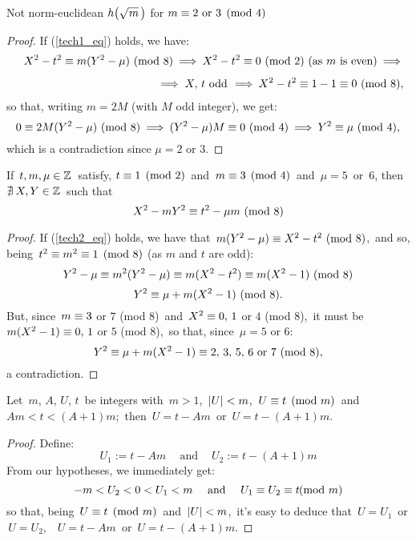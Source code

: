 \begin{subsection}{Not norm-euclidean $\hh{m}$ for %
                   $m \equiv 2 \text{ or } 3 \pmod 4$}
\begin{proof}
%
If (\ref{tech1_eq}) holds, we have:
\begin{eqnarray*}
& & X^2 - t^2 \equiv m(Y^2 - \mu)\ \mathrm{(mod\ 8)}
\:\Longrightarrow\: X^2 - t^2 \equiv 0\ \mathrm{(mod\ 2)}
\ \text{(as $m$ is even)} \:\Longrightarrow\:
\\[4pt]
& & \Longrightarrow\; X,\,t\ \textrm{odd}\, \:\Longrightarrow\:
X^2 - t^2 \equiv 1 - 1 \equiv 0\ \mathrm{(mod\ 8)},
\end{eqnarray*}
so that, writing $m = 2M$ (with $M$ odd integer), we get:
$$
0 \equiv 2M(Y^2 - \mu)\ \mathrm{(mod\ 8)} \:\Longrightarrow\:
(Y^2  - \mu)M \equiv 0\ \mathrm{(mod\ 4)} \:\Longrightarrow\:
Y^2 \equiv \mu\ \mathrm{(mod\ 4)},
$$
which is a contradiction since $\mu = 2$ or $3$.
%
\end{proof}

\begin{lem}\label{tech2}
If\, $t, m, \mu \in \mathbb{Z}$\, satisfy, $t \equiv 1 \pmod 2$
\,and\, $m \equiv 3 \pmod 4$ \,and\, $\mu = 5$ \,or\, $6$,
then\, $\nexists\: X, Y \in \mathbb{Z}$\, such that
\begin{equation}\label{tech2_eq}
X^2 - mY^2 \equiv t^2 - \mu m\ \mathrm{(mod\ 8)}
\end{equation}
\end{lem}

\begin{proof}
%
If (\ref{tech2_eq}) holds, we have that\,
$m(Y^2 - \mu) \congruent X^2 - t^2\ \mathrm{(mod\ 8)}$,\,
and so, being\, $t^2 \equiv m^2 \equiv 1 \pmod 8$
(as $m$ and $t$ are odd):
$$
Y^2 - \mu \equiv m^2(Y^2 - \mu) \equiv
m(X^2 - t^2) \equiv m(X^2 - 1)\ \mathrm{(mod\ 8)}
$$
\ie
$$
Y^2 \congruent \mu + m(X^2 - 1)\ \mathrm{(mod\ 8)}.
$$
But, since\, $m \equiv 3$ or $7$ (mod $8$)\, and\,
$X^2 \equiv 0,\, 1$ or $4$ (mod $8$),\, it must be\,
$m(X^2 - 1) \equiv 0,\, 1$ or $5$ (mod $8$),\, so
that, since\, $\mu = 5$ or $6$:
$$
Y^2 \equiv \mu + m(X^2 - 1) \equiv
2,\, 3,\, 5,\, 6\ \textrm{or}\ 7\ \mathrm{(mod\ 8)},
$$
a contradiction.
%
\end{proof}

\begin{lem}\label{tech3}
Let\, $m$, $A$, $U$, $t$\, be integers with\, $m > 1$,\, $\left|U\right| < m$,\,
$U \equiv t \pmod m$\, and\, $Am < t < (A + 1) m$;\, then\,
$U = t - Am$ \,or\, $U = t - (A+1)m$.
\end{lem}

\begin{proof}
%
Define:
$$U_1:= t - Am\quad\ \text{and}\quad\ U_2:= t - (A+1)m$$
From our hypotheses, we immediately get:
$$
  -m < U_2 < 0 < U_1 < m \quad\ \text{and} \quad
  \ U_1 \equiv U_2 \equiv t\!\!\!\pmod m
$$
so that, being\, $U \equiv t \pmod m$\, and \,$\left|U\right| < m$,\, it's easy
to deduce that\, $U = U_1$\, or \,$U = U_2$,\, \ie\, $U = t - Am$\,
or \,$U = t - (A + 1)m$.
%
\end{proof}


\end{subsection}
